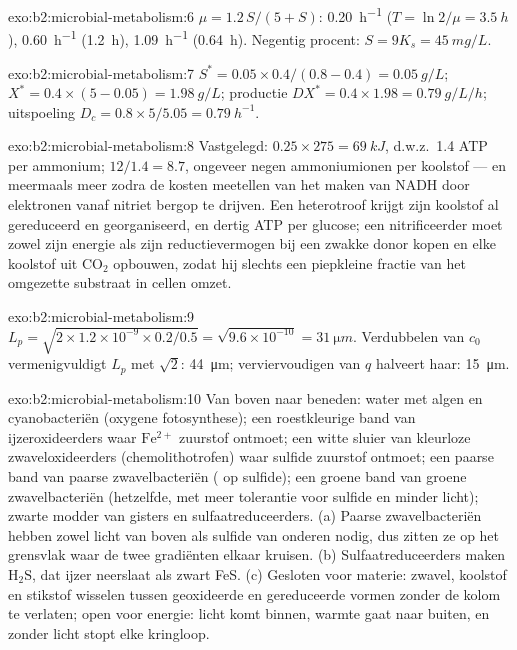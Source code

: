 \begin{solution}{exo:b2:microbial-metabolism:6}
$\mu = 1.2\,S/(5 + S)$: \qty{0.20}{h^{-1}} ($T = \ln 2/\mu =
\qty{3.5}{h}$), \qty{0.60}{h^{-1}} (\qty{1.2}{h}), \qty{1.09}{h^{-1}}
(\qty{0.64}{h}). Negentig procent: $S = 9K_s = \qty{45}{mg/L}$.
\end{solution}

\begin{solution}{exo:b2:microbial-metabolism:7}
$S^* = 0.05\times 0.4/(0.8 - 0.4) = \qty{0.05}{g/L}$; $X^* =
0.4\times(5 - 0.05) = \qty{1.98}{g/L}$; productie $DX^* = 0.4\times
1.98 = \qty{0.79}{g/L/h}$; uitspoeling $D_c = 0.8\times 5/5.05 =
\qty{0.79}{h^{-1}}$.
\end{solution}

\begin{solution}{exo:b2:microbial-metabolism:8}
Vastgelegd: $0.25\times 275 = \qty{69}{kJ}$, d.w.z.\ 1.4 ATP per
ammonium; $12/1.4 = 8.7$, ongeveer negen ammoniumionen per koolstof --- en
meermaals meer zodra de kosten meetellen van het maken van NADH door
elektronen vanaf nitriet bergop te drijven. Een heterotroof krijgt zijn
koolstof al gereduceerd en georganiseerd, en dertig ATP per glucose; een
nitrificeerder moet zowel zijn energie als zijn reductievermogen bij een
zwakke donor kopen en elke koolstof uit $\mathrm{CO_2}$ opbouwen, zodat
hij slechts een piepkleine fractie van het omgezette substraat in cellen
omzet.
\end{solution}

\begin{solution}{exo:b2:microbial-metabolism:9}
$L_p = \sqrt{2\times 1.2\times 10^{-9}\times 0.2/0.5} =
\sqrt{9.6\times 10^{-10}} = \qty{31}{\micro m}$. Verdubbelen van $c_0$
vermenigvuldigt $L_p$ met $\sqrt 2$: \qty{44}{\micro m}; verviervoudigen
van $q$ halveert haar: \qty{15}{\micro m}.
\end{solution}

\begin{solution}{exo:b2:microbial-metabolism:10}
Van boven naar beneden: water met algen en cyanobacteriën (oxygene
fotosynthese); een roestkleurige band van ijzeroxideerders waar
$\mathrm{Fe^{2+}}$ zuurstof ontmoet; een witte sluier van kleurloze
zwaveloxideerders (chemolithotrofen) waar sulfide zuurstof ontmoet; een
paarse band van paarse zwavelbacteriën ( op
sulfide); een groene band van groene zwavelbacteriën (hetzelfde, met
meer tolerantie voor sulfide en minder licht); zwarte modder van gisters
en sulfaatreduceerders. (a) Paarse zwavelbacteriën hebben zowel licht
van boven als sulfide van onderen nodig, dus zitten ze op het grensvlak
waar de twee gradiënten elkaar kruisen. (b) Sulfaatreduceerders maken
$\mathrm{H_2S}$, dat ijzer neerslaat als zwart FeS. (c) Gesloten voor
materie: zwavel, koolstof en stikstof wisselen tussen geoxideerde en
gereduceerde vormen zonder de kolom te verlaten; open voor energie:
licht komt binnen, warmte gaat naar buiten, en zonder licht stopt elke
kringloop.
\end{solution}

